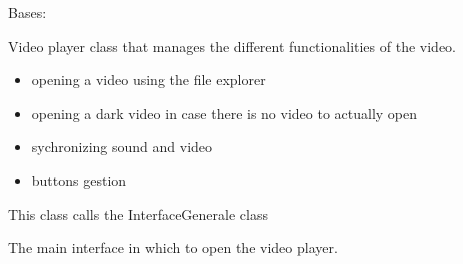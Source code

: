 \documentclass[letterpaper,10pt,english]{sphinxmanual}
\begin{document}

\begin{fulllineitems}
\label{\detokenize{general_interface:general_interface.LecteurVideo}}
\pysigstartsignatures
{}
\pysigstopsignatures
\sphinxAtStartPar
Bases: 

\sphinxAtStartPar
Video player class that manages the different functionalities of the video.
\begin{description}
\begin{itemize}
\item {} 
\sphinxAtStartPar
opening a video using the file explorer

\item {} 
\sphinxAtStartPar
opening a dark video \sphinxhyphen{} in case there is no video to actually open

\item {} 
\sphinxAtStartPar
sychronizing sound and video

\item {} 
\sphinxAtStartPar
buttons gestion

\end{itemize}

\end{description}

\sphinxAtStartPar
This class calls the InterfaceGenerale class

\begin{fulllineitems}
\label{\detokenize{general_interface:general_interface.LecteurVideo.interface_generale}}
\pysigstartsignatures
{}
\pysigstopsignatures
\sphinxAtStartPar
The main interface in which to open the video player.
\begin{quote}\begin{description}
\sphinxAtStartPar
{\hyperref[\detokenize{general_interface:general_interface.InterfaceGenerale}]{}}


\end{description}
\end{quote}
\end{fulllineitems}
\end{fulllineitems}
\end{document}
